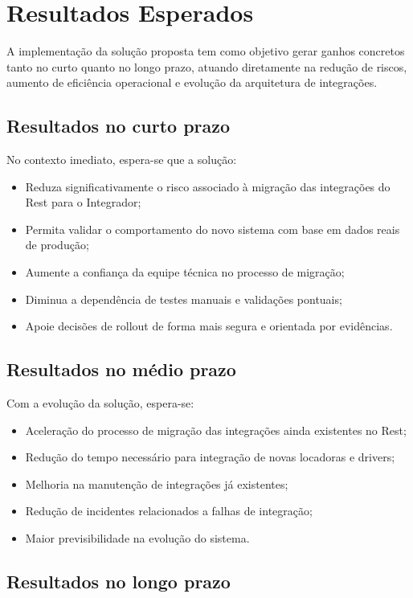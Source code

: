 \section{Resultados Esperados}

A implementação da solução proposta tem como objetivo gerar ganhos concretos tanto no curto quanto no longo prazo, atuando diretamente na redução de riscos, aumento de eficiência operacional e evolução da arquitetura de integrações.

\subsection{Resultados no curto prazo}

No contexto imediato, espera-se que a solução:
\begin{itemize}
    \item Reduza significativamente o risco associado à migração das integrações do Rest para o Integrador;
    \item Permita validar o comportamento do novo sistema com base em dados reais de produção;
    \item Aumente a confiança da equipe técnica no processo de migração;
    \item Diminua a dependência de testes manuais e validações pontuais;
    \item Apoie decisões de rollout de forma mais segura e orientada por evidências.
\end{itemize}

\subsection{Resultados no médio prazo}

Com a evolução da solução, espera-se:
\begin{itemize}
    \item Aceleração do processo de migração das integrações ainda existentes no Rest;
    \item Redução do tempo necessário para integração de novas locadoras e drivers;
    \item Melhoria na manutenção de integrações já existentes;
    \item Redução de incidentes relacionados a falhas de integração;
    \item Maior previsibilidade na evolução do sistema.
\end{itemize}

\subsection{Resultados no longo prazo}

